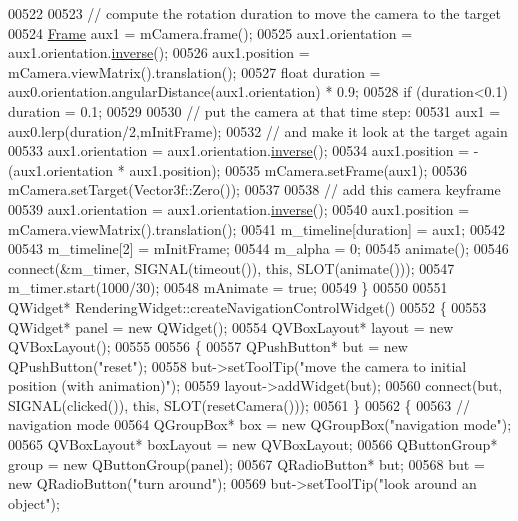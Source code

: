 \begin{DoxyCode}
00522 
00523   \textcolor{comment}{// compute the rotation duration to move the camera to the target}
00524   \hyperlink{class_frame}{Frame} aux1 = mCamera.frame();
00525   aux1.orientation = aux1.orientation.\hyperlink{group___geometry___module_a6a1d8af1fe34cb4127f705c0d10ef649}{inverse}();
00526   aux1.position = mCamera.viewMatrix().translation();
00527   \textcolor{keywordtype}{float} duration = aux0.orientation.angularDistance(aux1.orientation) * 0.9;
00528   \textcolor{keywordflow}{if} (duration<0.1) duration = 0.1;
00529 
00530   \textcolor{comment}{// put the camera at that time step:}
00531   aux1 = aux0.lerp(duration/2,mInitFrame);
00532   \textcolor{comment}{// and make it look at the target again}
00533   aux1.orientation = aux1.orientation.\hyperlink{group___geometry___module_a6a1d8af1fe34cb4127f705c0d10ef649}{inverse}();
00534   aux1.position = - (aux1.orientation * aux1.position);
00535   mCamera.setFrame(aux1);
00536   mCamera.setTarget(Vector3f::Zero());
00537 
00538   \textcolor{comment}{// add this camera keyframe}
00539   aux1.orientation = aux1.orientation.\hyperlink{group___geometry___module_a6a1d8af1fe34cb4127f705c0d10ef649}{inverse}();
00540   aux1.position = mCamera.viewMatrix().translation();
00541   m\_timeline[duration] = aux1;
00542 
00543   m\_timeline[2] = mInitFrame;
00544   m\_alpha = 0;
00545   animate();
00546   connect(&m\_timer, SIGNAL(timeout()), \textcolor{keyword}{this}, SLOT(animate()));
00547   m\_timer.start(1000/30);
00548   mAnimate = \textcolor{keyword}{true};
00549 \}
00550 
00551 QWidget* RenderingWidget::createNavigationControlWidget()
00552 \{
00553   QWidget* panel = \textcolor{keyword}{new} QWidget();
00554   QVBoxLayout* layout = \textcolor{keyword}{new} QVBoxLayout();
00555 
00556   \{
00557     QPushButton* but = \textcolor{keyword}{new} QPushButton(\textcolor{stringliteral}{"reset"});
00558     but->setToolTip(\textcolor{stringliteral}{"move the camera to initial position (with animation)"});
00559     layout->addWidget(but);
00560     connect(but, SIGNAL(clicked()), \textcolor{keyword}{this}, SLOT(resetCamera()));
00561   \}
00562   \{
00563     \textcolor{comment}{// navigation mode}
00564     QGroupBox* box = \textcolor{keyword}{new} QGroupBox(\textcolor{stringliteral}{"navigation mode"});
00565     QVBoxLayout* boxLayout = \textcolor{keyword}{new} QVBoxLayout;
00566     QButtonGroup* group = \textcolor{keyword}{new} QButtonGroup(panel);
00567     QRadioButton* but;
00568     but = \textcolor{keyword}{new} QRadioButton(\textcolor{stringliteral}{"turn around"});
00569     but->setToolTip(\textcolor{stringliteral}{"look around an object"});

\end{DoxyCode}
